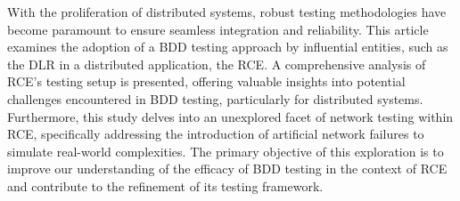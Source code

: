 With the proliferation of distributed systems, robust testing methodologies have become paramount to ensure seamless integration and reliability. This article examines the adoption of a \ac{BDD} testing approach by influential entities, such as the \ac{DLR} in a distributed application, the \ac{RCE}. A comprehensive analysis of \ac{RCE}'s testing setup is presented, offering valuable insights into potential challenges encountered in \ac{BDD} testing, particularly for distributed systems. Furthermore, this study delves into an unexplored facet of network testing within \ac{RCE}, specifically addressing the introduction of artificial network failures to simulate real-world complexities. The primary objective of this exploration is to improve our understanding of the efficacy of \ac{BDD} testing in the context of \ac{RCE} and contribute to the refinement of its testing framework.
